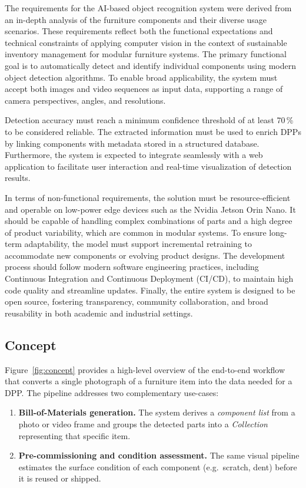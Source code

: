 \documentclass[3p,times,procedia]{elsarticle}
\begin{document}
The requirements for the AI-based object recognition system were derived from an in-depth analysis of the furniture components and their diverse usage scenarios. These requirements reflect both the functional expectations and technical constraints of applying computer vision in the context of sustainable inventory management for modular furniture systems. The primary functional goal is to automatically detect and identify individual components using modern object detection algorithms. To enable broad applicability, the system must accept both images and video sequences as input data, supporting a range of camera perspectives, angles, and resolutions.

Detection accuracy must reach a minimum confidence threshold of at least 70\,\% to be considered reliable. The extracted information must be used to enrich DPPs by linking components with metadata stored in a structured database. Furthermore, the system is expected to integrate seamlessly with a web application to facilitate user interaction and real-time visualization of detection results.

In terms of non-functional requirements, the solution must be resource-efficient and operable on low-power edge devices such as the Nvidia Jetson Orin Nano. It should be capable of handling complex combinations of parts and a high degree of product variability, which are common in modular systems. To ensure long-term adaptability, the model must support incremental retraining to accommodate new components or evolving product designs. The development process should follow modern software engineering practices, including Continuous Integration and Continuous Deployment (CI/CD), to maintain high code quality and streamline updates. Finally, the entire system is designed to be open source, fostering transparency, community collaboration, and broad reusability in both academic and industrial settings.

\subsection{Concept}
\label{sec:concept}

Figure~\ref{fig:concept} provides a high-level overview of the end-to-end workflow that converts a single photograph of a furniture item into the data needed for a DPP.  The pipeline addresses two complementary use-cases:

\begin{enumerate}
    \item \textbf{Bill-of-Materials generation.}  
          The system derives a \emph{component list} from a photo or video frame and groups the detected parts into a \emph{Collection} representing that specific item.
    \item \textbf{Pre-commissioning and condition assessment.}  
          The same visual pipeline estimates the surface condition of each component (e.g.\ scratch, dent) before it is reused or shipped.
\end{enumerate}
\end{document}

